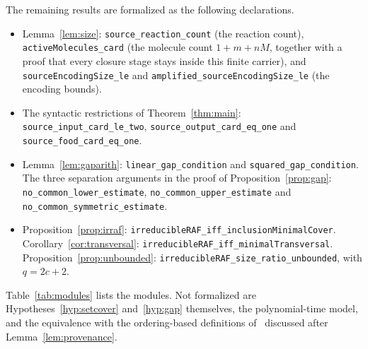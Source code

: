 \documentclass[11pt,a4paper]{article}
\theoremstyle{plain}
\theoremstyle{definition}
\theoremstyle{remark}
\newcommand{\lean}[1]{\texttt{#1}}
\begin{document}
The remaining results are formalized as the following declarations.
\begin{itemize}\raggedright
\item Lemma~\ref{lem:size}: \lean{source\_reaction\_count} (the reaction count), \lean{activeMolecules\_card} (the molecule count $1+m+nM$, together with a proof that every closure stage stays inside this finite carrier), and \lean{sourceEncodingSize\_le} and \lean{amplified\_sourceEncodingSize\_le} (the encoding bounds).
\item The syntactic restrictions of Theorem~\ref{thm:main}: \lean{source\_input\_card\_le\_two}, \lean{source\_output\_card\_eq\_one} and \lean{source\_food\_card\_eq\_one}.
\item Lemma~\ref{lem:gaparith}: \lean{linear\_gap\_condition} and \lean{squared\_gap\_condition}. The three separation arguments in the proof of Proposition~\ref{prop:gap}: \lean{no\_common\_lower\_estimate}, \lean{no\_common\_upper\_estimate} and \lean{no\_common\_symmetric\_estimate}.
\item Proposition~\ref{prop:irraf}: \lean{irreducibleRAF\_iff\_inclusionMinimalCover}. Corollary~\ref{cor:transversal}: \lean{irreducibleRAF\_iff\_minimalTransversal}. Proposition~\ref{prop:unbounded}: \lean{irreducibleRAF\_size\_ratio\_unbounded}, with $q=2c+2$.
\end{itemize}
Table~\ref{tab:modules} lists the modules. Not formalized are Hypotheses~\ref{hyp:setcover} and~\ref{hyp:gap} themselves, the polynomial-time model, and the equivalence with the ordering-based definitions of~\cite{hordijk2004detecting} discussed after Lemma~\ref{lem:provenance}.
\end{document}
